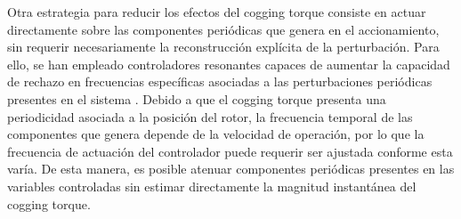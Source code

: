 %
%
%
%
%
%
%
%
%
%
%
%
Otra estrategia para reducir los efectos del cogging torque consiste en actuar directamente sobre las componentes periódicas que genera en el accionamiento, sin requerir necesariamente la reconstrucción explícita de la perturbación. Para ello, se han empleado controladores resonantes capaces de aumentar la capacidad de rechazo en frecuencias específicas asociadas a las perturbaciones periódicas presentes en el sistema \cite{ariasReducingCoggingTorque2019,wuSpeedControlLowSpeed2025}. Debido a que el cogging torque presenta una periodicidad asociada a la posición del rotor, la frecuencia temporal de las componentes que genera depende de la velocidad de operación, por lo que la frecuencia de actuación del controlador puede requerir ser ajustada conforme esta varía. De esta manera, es posible atenuar componentes periódicas presentes en las variables controladas sin estimar directamente la magnitud instantánea del cogging torque.
%
%
%
%
%
%
%
%
%
%
%
%
%
%
%
%
%
%

